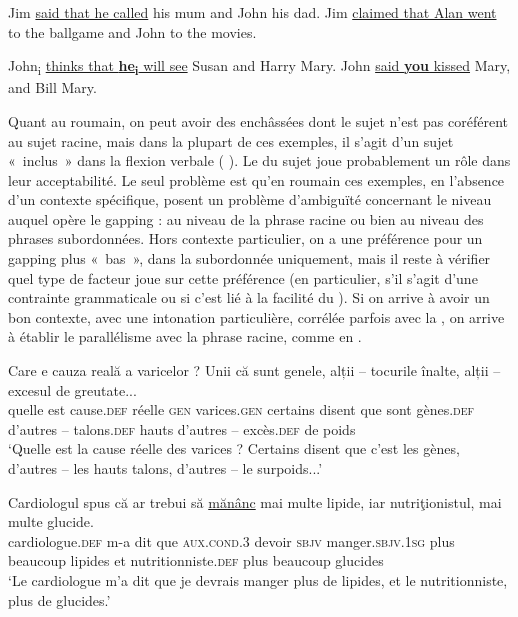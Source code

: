 \ea \label{ch2:ex128}
\ea  Jim \uline{said that he called} his mum and John his dad.
\ex *Jim \uline{claimed that Alan went} to the ballgame and John to the movies. \citep[12]{Repp2009}     
\z
\z

\ea \label{ch2:ex129}
\ea  John\textsubscript{i} \uline{thinks that \textbf{he}\textbf{\textsubscript{i}} will see} Susan and Harry Mary.
\ex *John \uline{said \textbf{you} kissed} Mary, and Bill Mary. \citep{Lasnik2006}
\z
\z

Quant au roumain, on peut avoir des enchâssées dont le sujet n’est pas co\-référent au sujet racine, mais dans la plupart de ces exemples, il s’agit d’un sujet «~inclus~» dans la flexion verbale ({\cad} ). Le  du sujet joue probablement un rôle dans leur acceptabilité. Le seul problème est qu’en roumain ces exemples, en l’absence d’un contexte spécifique, posent un problème d’ambiguïté concernant le niveau auquel opère le gapping : au niveau de la phrase racine ou bien au niveau des phrases subordonnées. Hors contexte particulier, on a une préférence pour un gapping plus «~bas~», dans la subordonnée uniquement, mais il reste à vérifier quel type de facteur joue sur cette préférence (en particulier, s’il s’agit d’une contrainte grammaticale ou si c’est lié à la facilité du ). Si on arrive à avoir un bon contexte, avec une intonation particulière, corrélée parfois avec la , on arrive à établir le parallélisme avec la phrase racine, comme en .

\ea \label{ch2:ex130}
\ea 
\gll Care  e  cauza  reală  a  {varicelor ?}  Unii    că  sunt  genele, alții  –  tocurile  înalte,  alții  –  excesul  de  greutate...\\ 
quelle  est  cause.\textsc{def}  réelle  \textsc{gen}  varices.\textsc{gen}  certains  disent  que  sont  gènes.\textsc{def} d’autres  –  talons.\textsc{def}  hauts  d’autres  –  excès.\textsc{def}  de  poids\\
\glt ‘Quelle est la cause réelle des varices ? Certains disent que c’est les gènes, d’autres – les hauts talons, d’autres – le surpoids...’

\ex 
\gll Cardiologul    spus  că  ar  trebui  să  \uline{mănânc} mai multe  lipide,  iar  nutriţionistul,  mai  multe  glucide.\\
cardiologue.\textsc{def}  m-a  dit  que  \textsc{aux.cond.3} devoir  \textsc{sbjv} manger.\textsc{sbjv.1sg}  plus beaucoup  lipides  et  nutritionniste.\textsc{def}  plus  beaucoup  glucides\\
\glt ‘Le cardiologue m’a dit que je devrais manger plus de lipides, et le nutritionniste, plus de glucides.’ 
\z
\z

